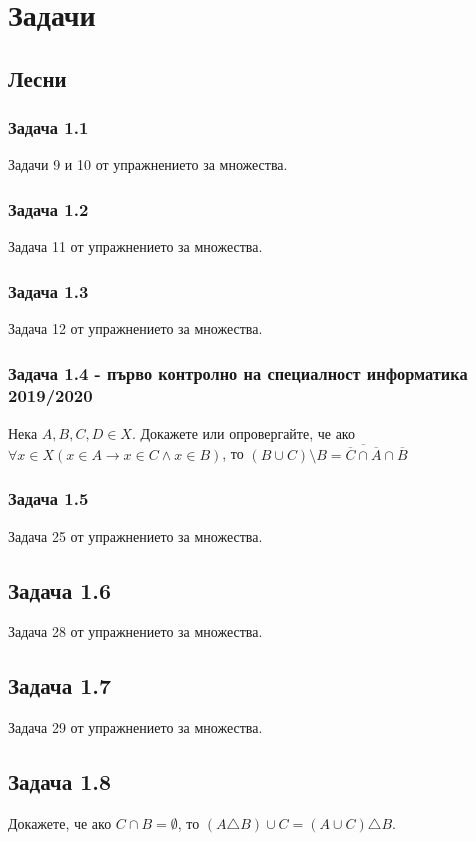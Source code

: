 \documentclass[12pt]{article}
\begin{document}
\section*{Задачи}

\subsection*{Лесни}
\subsubsection*{Задача 1.1}
Задачи 9 и 10 от упражнението за множества.

\subsubsection*{Задача 1.2}
Задача 11 от упражнението за множества.

\subsubsection*{Задача 1.3}
Задача 12 от упражнението за множества.

\subsubsection*{Задача 1.4 - първо контролно на специалност информатика 2019/2020}
Нека $A, B, C, D \in X$. Докажете или опровергайте, че ако $\forall x \in X (x \in A \rightarrow x \in C \land x \in B)$, то $(B \cup C) \setminus B = \overline{\overline{C} \cap \overline{A}} \cap \overline{B}$

\subsubsection*{Задача 1.5}
Задача 25 от упражнението за множества.

\subsection*{Задача 1.6}
Задача 28 от упражнението за множества.

\subsection*{Задача 1.7}
Задача 29 от упражнението за множества.

\subsection*{Задача 1.8}
Докажете, че ако $C \cap B = \emptyset$, то $(A \triangle B) \cup C = (A \cup C) \triangle B$.
\end{document}
